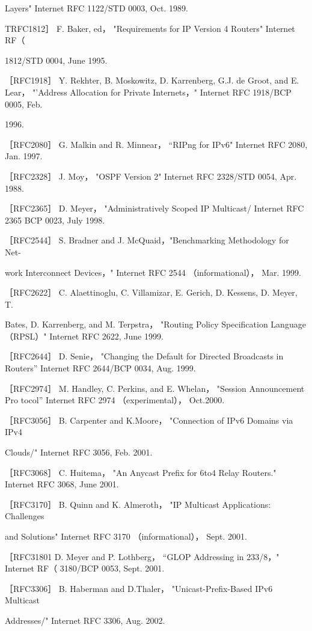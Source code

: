 Layers" Internet RFC 1122/STD 0003, Oct. 1989.

TRFC1812］ F. Baker, ed， "Requirements for IP Version 4 Routers" Internet RF（

1812/STD 0004, June 1995.

［RFC1918］ Y. Rekhter, B. Moskowitz, D. Karrenberg, G.J. de Groot, and E. Lear，
"'Address Allocation for Private Internets，" Internet RFC 1918/BCP 0005, Feb.

1996.

［RFC2080］ G. Malkin and R. Minnear， “RIPng for IPv6" Internet RFC 2080, Jan.
1997.

［RFC2328］ J. Moy， "OSPF Version 2" Internet RFC 2328/STD 0054, Apr. 1988.

［RFC2365］ D. Meyer， "Administratively Scoped IP Multicast/ Internet RFC 2365
BCP 0023, July 1998.

［RFC2544］ S. Bradner and J. McQuaid，"Benchmarking Methodology for Net-

work Interconnect Devices，" Internet RFC 2544 （informational）， Mar. 1999.

［RFC2622］ C. Alaettinoglu, C. Villamizar, E. Gerich, D. Kessens, D. Meyer, T.

Bates, D. Karrenberg, and M. Terpstra， "Routing Policy Specification Language
（RPSL）" Internet RFC 2622, June 1999.

［RFC2644］ D. Senie， "Changing the Default for Directed Broadcasts in Routers”
Internet RFC 2644/BCP 0034, Aug. 1999.

［RFC2974］ M. Handley, C. Perkins, and E. Whelan， "Session Announcement Pro
tocol” Internet RFC 2974 （experimental）， Oct.2000.

［RFC3056］ B. Carpenter and K.Moore， "Connection of IPv6 Domains via IPv4

Clouds/" Internet RFC 3056, Feb. 2001.

［RFC3068］ C. Huitema， "An Anycast Prefix for 6to4 Relay Routers." Internet RFC
3068, June 2001.

［RFC3170］ B. Quinn and K. Almeroth， "IP Multicast Applications: Challenges

and Solutions" Internet RFC 3170 （informational）， Sept. 2001.

［RFC31801 D. Meyer and P. Lothberg， “GLOP Addressing in 233/8，" Internet RF（
3180/BCP 0053, Sept. 2001.

［RFC3306］ B. Haberman and D.Thaler， "Unicast-Prefix-Based IPv6 Multicast

Addresses/" Internet RFC 3306, Aug. 2002.

